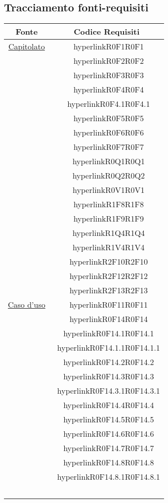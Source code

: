 \documentclass[../AnalisiDeiRequisiti.tex]{subfiles}
\begin{document}
\subsection{Tracciamento fonti-requisiti}
\normalsize
\begin{longtable}{|c|c|}
	\hline
	\textbf{Fonte} & \textbf{Codice Requisiti} \\
	\hline
	\endhead
	\hyperlink{Capitolato}{Capitolato} & \
	hyperlink{R0F1}{R0F1}\\& \
	hyperlink{R0F2}{R0F2}\\& \
	hyperlink{R0F3}{R0F3}\\& \
	hyperlink{R0F4}{R0F4}\\& \
	hyperlink{R0F4.1}{R0F4.1}\\& \
	hyperlink{R0F5}{R0F5}\\& \
	hyperlink{R0F6}{R0F6}\\& \
	hyperlink{R0F7}{R0F7}\\& \
	hyperlink{R0Q1}{R0Q1}\\& \
	hyperlink{R0Q2}{R0Q2}\\& \
	hyperlink{R0V1}{R0V1}\\& \
	hyperlink{R1F8}{R1F8}\\& \
	hyperlink{R1F9}{R1F9}\\& \
	hyperlink{R1Q4}{R1Q4}\\& \
	hyperlink{R1V4}{R1V4}\\& \
	hyperlink{R2F10}{R2F10}\\& \
	hyperlink{R2F12}{R2F12}\\& \
	hyperlink{R2F13}{R2F13}\\\hline
	\hyperlink{Caso d'uso}{Caso d'uso} & \
	hyperlink{R0F11}{R0F11}\\& \
	hyperlink{R0F14}{R0F14}\\& \
	hyperlink{R0F14.1}{R0F14.1}\\& \
	hyperlink{R0F14.1.1}{R0F14.1.1}\\& \
	hyperlink{R0F14.2}{R0F14.2}\\& \
	hyperlink{R0F14.3}{R0F14.3}\\& \
	hyperlink{R0F14.3.1}{R0F14.3.1}\\& \
	hyperlink{R0F14.4}{R0F14.4}\\& \
	hyperlink{R0F14.5}{R0F14.5}\\& \
	hyperlink{R0F14.6}{R0F14.6}\\& \
	hyperlink{R0F14.7}{R0F14.7}\\& \
	hyperlink{R0F14.8}{R0F14.8}\\& \
	hyperlink{R0F14.8.1}{R0F14.8.1}\\& \

\end{longtable}
\end{document}
